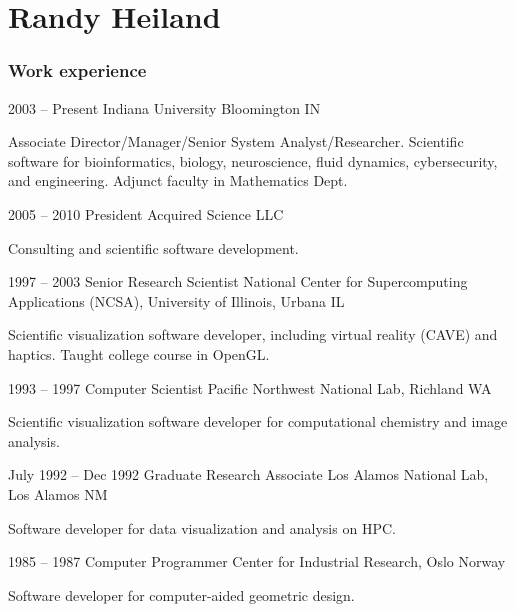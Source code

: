 \documentclass{tccv}
\begin{document}
\part{Randy Heiland}

\section{Work experience}

\begin{eventlist}

\item{2003 -- Present}
{Indiana University}
{Bloomington IN}

Associate Director/Manager/Senior System Analyst/Researcher.
Scientific software for bioinformatics, biology,
neuroscience, fluid dynamics, cybersecurity, and engineering.
Adjunct faculty in Mathematics Dept. 

\item{2005 -- 2010}
     {President}
     {Acquired Science LLC}

Consulting and scientific software development.

\item{1997 -- 2003}
     {Senior Research Scientist}
     {National Center for Supercomputing Applications (NCSA), University of
Illinois, Urbana IL}

Scientific visualization software developer, including virtual reality (CAVE) and haptics.
Taught college course in OpenGL.

\item{1993 -- 1997}
     {Computer Scientist}
     {Pacific Northwest National Lab, Richland WA}

Scientific visualization software developer for computational chemistry and image analysis.

\item{July 1992 -- Dec 1992}
     {Graduate Research Associate}
     {Los Alamos National Lab, Los Alamos NM}

Software developer for data visualization and analysis on HPC.

\item{1985 -- 1987}
     {Computer Programmer}
     {Center for Industrial Research, Oslo Norway}

Software developer for computer-aided geometric design.

\end{eventlist}

\end{document}
